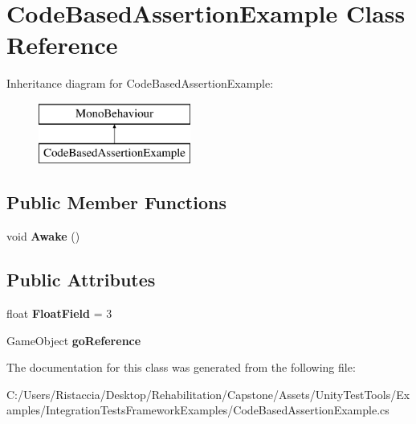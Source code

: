 \hypertarget{class_code_based_assertion_example}{}\section{Code\+Based\+Assertion\+Example Class Reference}
\label{class_code_based_assertion_example}
Inheritance diagram for Code\+Based\+Assertion\+Example\+:\begin{figure}[H]
\begin{center}
\leavevmode
\includegraphics[height=2.000000cm]{class_code_based_assertion_example}
\end{center}
\end{figure}
\subsection*{Public Member Functions}
\begin{DoxyCompactItemize}
\item 
\mbox{\label{class_code_based_assertion_example_aaf9e302faa94515e0c07acea6e9650df}} 
void {\bfseries Awake} ()
\end{DoxyCompactItemize}
\subsection*{Public Attributes}
\begin{DoxyCompactItemize}
\item 
\mbox{\label{class_code_based_assertion_example_a0e490a4099373f0cbd746ad436d9512b}} 
float {\bfseries Float\+Field} = 3
\item 
\mbox{\label{class_code_based_assertion_example_a760f7d167b8e6aeb4661a3126e97781a}} 
Game\+Object {\bfseries go\+Reference}
\end{DoxyCompactItemize}


The documentation for this class was generated from the following file\+:\begin{DoxyCompactItemize}
\item 
C\+:/\+Users/\+Ristaccia/\+Desktop/\+Rehabilitation/\+Capstone/\+Assets/\+Unity\+Test\+Tools/\+Examples/\+Integration\+Tests\+Framework\+Examples/Code\+Based\+Assertion\+Example.\+cs\end{DoxyCompactItemize}
